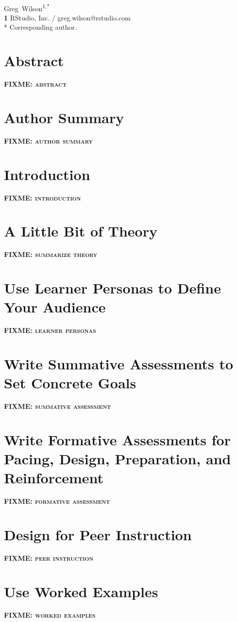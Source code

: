 \documentclass[10pt,letterpaper]{article}
\newcommand{\fixme}[1]{\textsc{\textbf{FIXME: {#1}}}}
\newcommand{\rulemajor}[1]{\section{#1}}
\begin{document}
\vspace*{0.2in}

\begin{flushleft}
{\Large
\textbf{}
}
\newline
\\
{Greg~Wilson}\textsuperscript{1,*}
\\
\textbf{1} RStudio, Inc. / greg.wilson@rstudio.com
\\
\bigskip
* Corresponding author.
\end{flushleft}

\section*{Abstract}

\fixme{abstract}

\section*{Author Summary}

\fixme{author summary}

\section*{Introduction}

\fixme{introduction}

\section*{A Little Bit of Theory}

\fixme{summarize theory}

\rulemajor{Use Learner Personas to Define Your Audience}

\fixme{learner personas}

\rulemajor{Write Summative Assessments to Set Concrete Goals}

\fixme{summative assessment}

\rulemajor{Write Formative Assessments for Pacing, Design, Preparation, and Reinforcement}

\fixme{formative assessment}

\rulemajor{Design for Peer Instruction}

\fixme{peer instruction}

\rulemajor{Use Worked Examples}

\fixme{worked examples}
\end{document}
